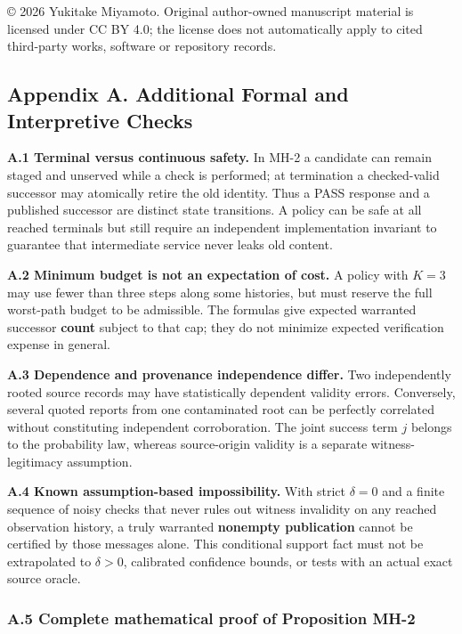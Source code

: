 \documentclass[
  10pt,
  american,
  a4paper,
]{article}
\begin{document}
© 2026 Yukitake Miyamoto. Original author-owned manuscript material is
licensed under CC BY 4.0; the license does not automatically apply to
cited third-party works, software or repository records.

\hypertarget{appendix-a.-additional-formal-and-interpretive-checks}{%
\subsection{Appendix A. Additional Formal and Interpretive
Checks}\label{appendix-a.-additional-formal-and-interpretive-checks}}

\textbf{A.1 Terminal versus continuous safety.} In MH-2 a candidate can
remain staged and unserved while a check is performed; at termination a
checked-valid successor may atomically retire the old identity. Thus a
PASS response and a published successor are distinct state transitions.
A policy can be safe at all reached terminals but still require an
independent implementation invariant to guarantee that intermediate
service never leaks old content.

\textbf{A.2 Minimum budget is not an expectation of cost.} A policy with
\(K=3\) may use fewer than three steps along some histories, but must
reserve the full worst-path budget to be admissible. The formulas give
expected warranted successor \textbf{count} subject to that cap; they do
not minimize expected verification expense in general.

\textbf{A.3 Dependence and provenance independence differ.} Two
independently rooted source records may have statistically dependent
validity errors. Conversely, several quoted reports from one
contaminated root can be perfectly correlated without constituting
independent corroboration. The joint success term \(j\) belongs to the
probability law, whereas source-origin validity is a separate
witness-legitimacy assumption.

\textbf{A.4 Known assumption-based impossibility.} With strict
\(\delta=0\) and a finite sequence of noisy checks that never rules out
witness invalidity on any reached observation history, a truly warranted
\textbf{nonempty publication} cannot be certified by those messages
alone. This conditional support fact must not be extrapolated to
\(\delta>0\), calibrated confidence bounds, or tests with an actual
exact source oracle.

\hypertarget{a.5-complete-mathematical-proof-of-proposition-mh-2}{%
\subsubsection{A.5 Complete mathematical proof of Proposition
MH-2}\label{a.5-complete-mathematical-proof-of-proposition-mh-2}}
\end{document}
